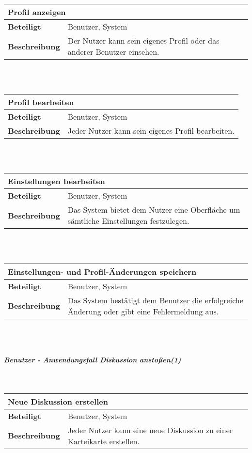 \documentclass[12pt,a4paper]{article}
\begin{document}
\begin{tabular}{l p{10cm}}
\multicolumn{2}{l}{\textbf{Profil anzeigen}} \\ \hline
\textbf{Beteiligt} & Benutzer, System \\ \hline 
\textbf{Beschreibung} & Der Nutzer kann sein eigenes Profil oder das anderer Benutzer einsehen.\\ 
\hline 
\end{tabular}\\\\

\begin{tabular}{l p{10cm}}
\multicolumn{2}{l}{\textbf{Profil bearbeiten}} \\ \hline
\textbf{Beteiligt} & Benutzer, System \\ \hline 
\textbf{Beschreibung} & Jeder Nutzer kann sein eigenes Profil bearbeiten.\\ 
\hline 
\end{tabular}\\\\

\begin{tabular}{l p{10cm}}
\multicolumn{2}{l}{\textbf{Einstellungen bearbeiten}} \\ \hline
\textbf{Beteiligt} & Benutzer, System \\ \hline 
\textbf{Beschreibung} & Das System bietet dem Nutzer eine Oberfläche um sämtliche Einstellungen festzulegen.\\ 
\hline 
\end{tabular}\\\\

\begin{tabular}{l p{10cm}}
\multicolumn{2}{l}{\textbf{Einstellungen- und Profil-Änderungen speichern}} \\ \hline
\textbf{Beteiligt} & Benutzer, System \\ \hline 
\textbf{Beschreibung} & Das System bestätigt dem Benutzer die erfolgreiche Änderung oder gibt eine Fehlermeldung aus.\\ 
\hline 
\end{tabular}\\\\
\subparagraph{Benutzer - Anwendungsfall \glqq Diskussion anstoßen\grqq (1)}\mbox{}\\

\begin{tabular}{l p{10cm}}
\multicolumn{2}{l}{\textbf{Neue Diskussion erstellen}} \\ \hline
\textbf{Beteiligt} & Benutzer, System \\ \hline 
\textbf{Beschreibung} & Jeder Nutzer kann eine neue Diskussion zu einer Karteikarte erstellen.\\ 
\hline 
\end{tabular}\\\\
\end{document}
